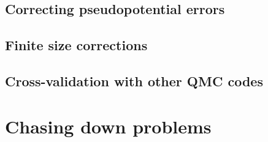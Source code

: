 \subsection{Correcting pseudopotential errors}
\subsection{Finite size corrections}
\subsection{Cross-validation with other QMC codes}
\section{Chasing down problems}


